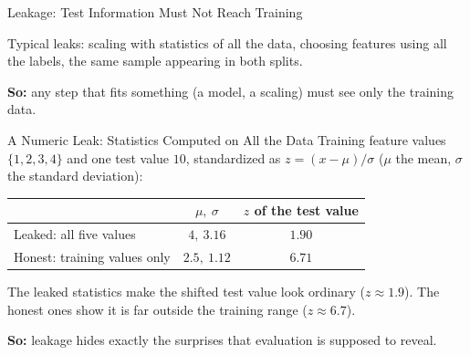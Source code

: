\documentclass{ntuabeamer}
\newcommand{\takeaway}[1]{\par\vspace{0.3cm}\begingroup\raggedright\noindent
  {\color{courseblue}\textbf{So:}} #1\par\endgroup}
\begin{document}
\begin{frame}{Leakage: Test Information Must Not Reach Training}
  \centering

  \vspace{0.2cm}
  Typical leaks: scaling with statistics of all the data, choosing features using all the labels,
  the same sample appearing in both splits.
  \takeaway{any step that fits something (a model, a scaling) must see only the training data.}
\end{frame}

\begin{frame}{A Numeric Leak: Statistics Computed on All the Data}
  Training feature values $\{1,2,3,4\}$ and one test value $10$, standardized as $z=(x-\mu)/\sigma$
  ($\mu$ the mean, $\sigma$ the standard deviation):
  \begin{center}
    \begin{tabular}{lcc}
      \toprule
      & $\mu,\ \sigma$ & $z$ of the test value \\
      \midrule
      Leaked: all five values & $4,\ 3.16$ & $1.90$ \\
      Honest: training values only & $2.5,\ 1.12$ & $6.71$ \\
      \bottomrule
    \end{tabular}
  \end{center}
  The leaked statistics make the shifted test value look ordinary ($z\approx 1.9$).
  The honest ones show it is far outside the training range ($z\approx 6.7$).
  \takeaway{leakage hides exactly the surprises that evaluation is supposed to reveal.}
\end{frame}
\end{document}

